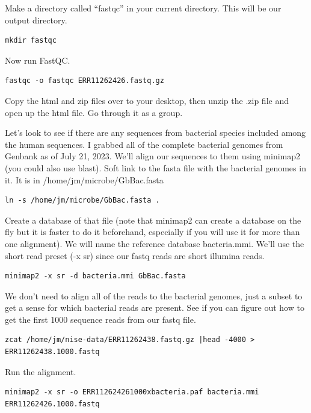 \documentclass[
]{book}
\begin{document}
Make a directory called ``fastqc'' in your current directory. This will be our output directory.

\begin{verbatim}
mkdir fastqc
\end{verbatim}

Now run FastQC.

\begin{verbatim}
fastqc -o fastqc ERR11262426.fastq.gz
\end{verbatim}

Copy the html and zip files over to your desktop, then unzip the .zip file and open up the html file. Go through it as a group.

Let's look to see if there are any sequences from bacterial species included among the human sequences. I grabbed all of the complete bacterial genomes from Genbank as of July 21, 2023. We'll align our sequences to them using minimap2 (you could also use blast). Soft link to the fasta file with the bacterial genomes in it. It is in /home/jm/microbe/GbBac.fasta

\begin{verbatim}
ln -s /home/jm/microbe/GbBac.fasta .
\end{verbatim}

Create a database of that file (note that minimap2 can create a database on the fly but it is faster to do it beforehand, especially if you will use it for more than one alignment). We will name the reference database bacteria.mmi. We'll use the short read preset (-x sr) since our fastq reads are short illumina reads.

\begin{verbatim}
minimap2 -x sr -d bacteria.mmi GbBac.fasta
\end{verbatim}

We don't need to align all of the reads to the bacterial genomes, just a subset to get a sense for which bacterial reads are present. See if you can figure out how to get the first 1000 sequence reads from our fastq file.

\begin{verbatim}
zcat /home/jm/nise-data/ERR11262438.fastq.gz |head -4000 > ERR11262438.1000.fastq
\end{verbatim}

Run the alignment.

\begin{verbatim}
minimap2 -x sr -o ERR112624261000xbacteria.paf bacteria.mmi ERR11262426.1000.fastq
\end{verbatim}
\end{document}

